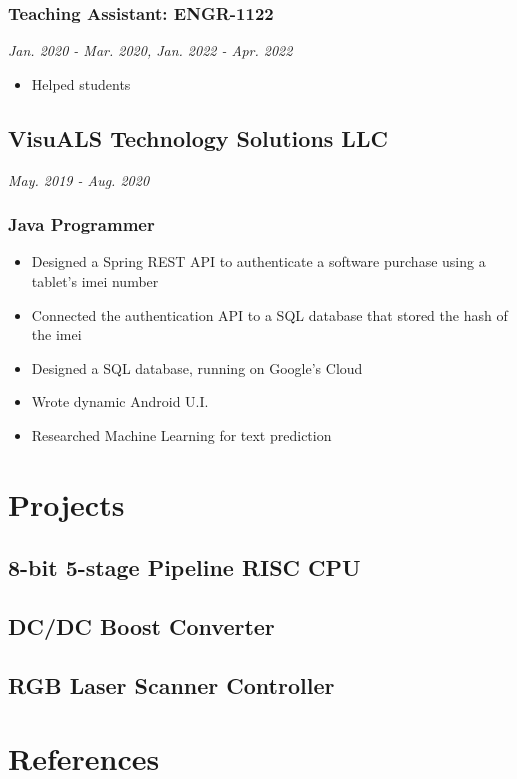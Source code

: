 \documentclass{article}
\begin{document}
\begin{spacing}{.5}
		\subsubsection{\small{Teaching Assistant: ENGR-1122}} \hfill \scriptsize{\textsl{Jan. 2020 - Mar. 2020, Jan. 2022 - Apr. 2022}}
			\begin{itemize}[label=$\bullet$,itemsep=-.75ex]
				\item \small{Helped students}
			\end{itemize}
	\subsection{VisuALS Technology Solutions LLC} \hfill \scriptsize{\textsl{May. 2019 - Aug. 2020}}
		\subsubsection{\small{Java Programmer}}
			\begin{itemize}[label=$\bullet$,itemsep=-.75ex]
				\item \small{Designed a Spring REST API to authenticate a software purchase using a tablet's imei number}
				\item \small{Connected the authentication API to a SQL database that stored the hash of the imei}
				\item \small{Designed a SQL database, running on Google's Cloud}
				\item \small{Wrote dynamic Android U.I.}
				\item \small{Researched Machine Learning for text prediction}
			\end{itemize}

\section{Projects}
	\subsection{8-bit 5-stage Pipeline RISC CPU}
	\subsection{DC/DC Boost Converter}
	\subsection{RGB Laser Scanner Controller}

\section{References}

\end{spacing}
\end{document}
